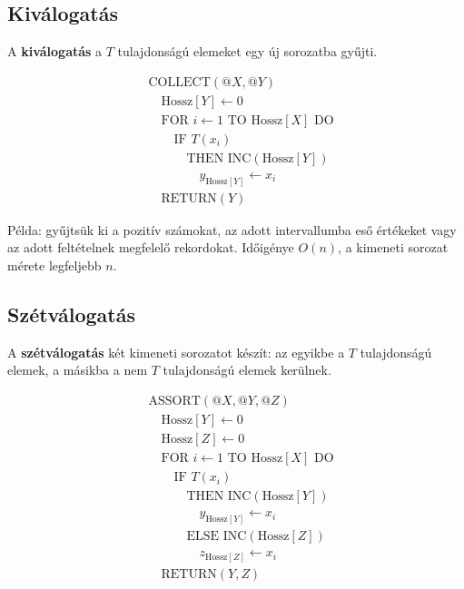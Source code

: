 \subsection{Kiválogatás}

A \textbf{kiválogatás} a $T$ tulajdonságú elemeket egy új sorozatba gyűjti.

\[
\begin{aligned}
&\text{COLLECT}(@X,@Y)\\
&\quad \text{Hossz}[Y]\leftarrow 0\\
&\quad \text{FOR } i\leftarrow 1 \text{ TO Hossz}[X] \text{ DO}\\
&\quad\quad \text{IF } T(x_i)\\
&\quad\quad\quad \text{THEN INC}(\text{Hossz}[Y])\\
&\quad\quad\quad\quad y_{\text{Hossz}[Y]}\leftarrow x_i\\
&\quad \text{RETURN}(Y)
\end{aligned}
\]

Példa: gyűjtsük ki a pozitív számokat, az adott intervallumba eső értékeket vagy az adott feltételnek megfelelő rekordokat. Időigénye $O(n)$, a kimeneti sorozat mérete legfeljebb $n$.

\subsection{Szétválogatás}

A \textbf{szétválogatás} két kimeneti sorozatot készít: az egyikbe a $T$ tulajdonságú elemek, a másikba a nem $T$ tulajdonságú elemek kerülnek.

\[
\begin{aligned}
&\text{ASSORT}(@X,@Y,@Z)\\
&\quad \text{Hossz}[Y]\leftarrow 0\\
&\quad \text{Hossz}[Z]\leftarrow 0\\
&\quad \text{FOR } i\leftarrow 1 \text{ TO Hossz}[X] \text{ DO}\\
&\quad\quad \text{IF } T(x_i)\\
&\quad\quad\quad \text{THEN INC}(\text{Hossz}[Y])\\
&\quad\quad\quad\quad y_{\text{Hossz}[Y]}\leftarrow x_i\\
&\quad\quad\quad \text{ELSE INC}(\text{Hossz}[Z])\\
&\quad\quad\quad\quad z_{\text{Hossz}[Z]}\leftarrow x_i\\
&\quad \text{RETURN}(Y,Z)
\end{aligned}
\]

